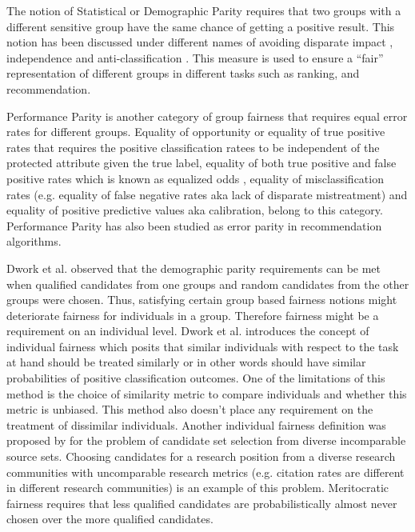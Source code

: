     The notion of Statistical or Demographic Parity requires that two groups with a different sensitive group have the same chance of getting a positive result. This notion has been discussed under different names of avoiding disparate impact \cite{Feldman2015}, independence \cite{barocas2018fairness} and anti-classification \cite{corbett2018measure}. This measure is used to ensure a ``fair'' representation of different groups in different tasks such as ranking\cite{singh2018fairness,zehlike2017fa,yang2017measuring}, and recommendation\cite{mehtora2018towards,ekstrand2018exploring}.
    
    Performance Parity is another category of group fairness that requires equal error rates for different groups. Equality of opportunity or equality of true positive rates \cite{hardt2016equality} that requires the positive classification ratees to be independent of the protected attribute given the true label, equality of both true positive and false positive rates which is known as equalized odds \cite{hardt2016equality}, equality of misclassification rates (e.g. equality of false negative rates aka lack of disparate mistreatment\cite{zafar2017fairness}) and equality of positive predictive values aka calibration, belong to this category. 
    Performance Parity has also been studied as error parity in recommendation algorithms\cite{ekstrand2018all,yao_huang_fatml-2017}.


Dwork et al. \cite{Dwork2012individual} observed that the demographic parity requirements can be met when qualified candidates from one groups and random candidates from the other groups were chosen. Thus, satisfying certain group based fairness notions might deteriorate fairness for individuals in a group. Therefore fairness might be a requirement on an individual level.
Dwork et al. \cite{Dwork2012individual} introduces the concept of individual fairness \cite{Dwork2012individual} which posits that similar individuals with respect to the task at hand should be treated similarly or in other words should have similar probabilities of positive classification outcomes. One of the limitations of this method is the choice of similarity metric to compare individuals and whether this metric is unbiased. This method also doesn't place any requirement on the treatment of dissimilar individuals.
Another individual fairness definition was proposed by \cite{pmlr-v70-kearns17a} for the problem of candidate set selection from diverse incomparable source sets. Choosing candidates for a research position from a diverse research communities with uncomparable research metrics (e.g. citation rates are different in different research communities) is an example of this problem. Meritocratic fairness requires that less qualified candidates are probabilistically almost never chosen over the more qualified candidates.

